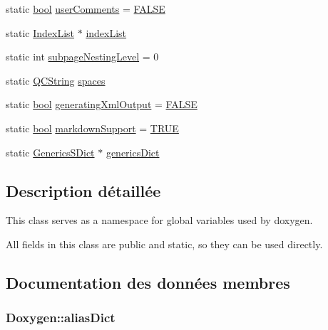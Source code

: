 \begin{DoxyCompactItemize}
\item 
static \hyperlink{qglobal_8h_a1062901a7428fdd9c7f180f5e01ea056}{bool} \hyperlink{class_doxygen_aa3fdcd31e3aed249e9f27d76dd11d12e}{user\+Comments} = \hyperlink{qglobal_8h_a10e004b6916e78ff4ea8379be80b80cc}{F\+A\+L\+S\+E}
\item 
static \hyperlink{class_index_list}{Index\+List} $\ast$ \hyperlink{class_doxygen_a91aa9805ef52783816d9da5e457b8cfb}{index\+List}
\item 
static int \hyperlink{class_doxygen_a6a2eb84be879cca04e934c86d7b0cd94}{subpage\+Nesting\+Level} = 0
\item 
static \hyperlink{class_q_c_string}{Q\+C\+String} \hyperlink{class_doxygen_a89b66309f30c63ea1a7b5d5d17bf12bf}{spaces}
\item 
static \hyperlink{qglobal_8h_a1062901a7428fdd9c7f180f5e01ea056}{bool} \hyperlink{class_doxygen_ac07e39c40aff392de965adff59f779ff}{generating\+Xml\+Output} = \hyperlink{qglobal_8h_a10e004b6916e78ff4ea8379be80b80cc}{F\+A\+L\+S\+E}
\item 
static \hyperlink{qglobal_8h_a1062901a7428fdd9c7f180f5e01ea056}{bool} \hyperlink{class_doxygen_af9c005860944572c032482c0c9b7a172}{markdown\+Support} = \hyperlink{qglobal_8h_a04a6422a52070f0dc478693da640242b}{T\+R\+U\+E}
\item 
static \hyperlink{class_generics_s_dict}{Generics\+S\+Dict} $\ast$ \hyperlink{class_doxygen_aded2bc2f334b1446d014ca0c0814ba00}{generics\+Dict}
\end{DoxyCompactItemize}


\subsection{Description détaillée}
This class serves as a namespace for global variables used by doxygen. 

All fields in this class are public and static, so they can be used directly. 

\subsection{Documentation des données membres}
\hypertarget{class_doxygen_a2699fd682e95cf491bcd66624be0aa0b}{}
\subsubsection[{alias\+Dict}]{ Doxygen\+::alias\+Dict\hspace{0.3cm}{\ttfamily [static]}}\label{class_doxygen_a2699fd682e95cf491bcd66624be0aa0b}
\hypertarget{class_doxygen_acd0346761dcfd739ea0722d6451d436b}{}
